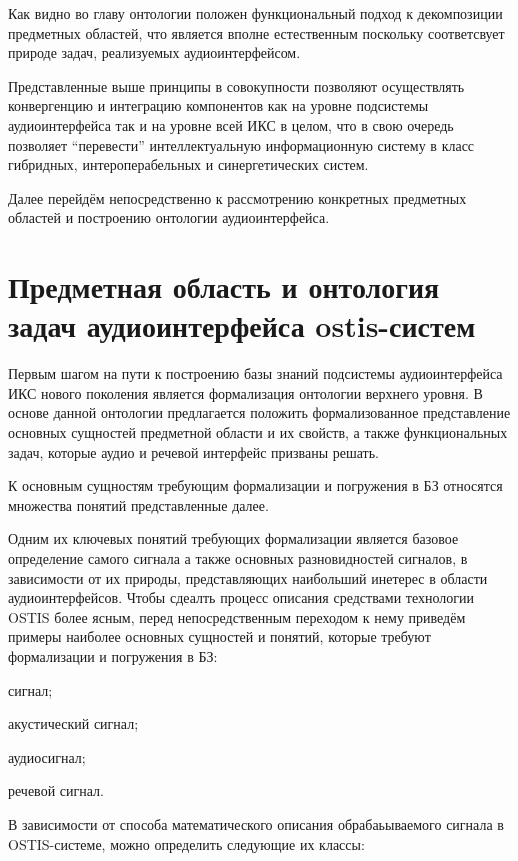 Как видно во главу онтологии положен функциональный подход к декомпозиции предметных областей, что является вполне естественным поскольку соответсвует природе задач, реализуемых аудиоинтерфейсом.

Представленные выше принципы в совокупности позволяют осуществлять конвергенцию и интеграцию компонентов как на уровне подсистемы аудиоинтерфейса так и на уровне всей ИКС в целом, что в свою очередь позволяет “перевести” интеллектуальную информационную систему в класс гибридных, интероперабельных и синергетических систем.
  
 Далее перейдём непосредственно к рассмотрению конкретных предметных областей и построению онтологии аудиоинтерфейса.

\section{Предметная область и онтология задач аудиоинтерфейса ostis-систем}
Первым шагом на пути к построению базы знаний подсистемы аудиоинтерфейса ИКС нового поколения является формализация онтологии верхнего уровня. В основе данной онтологии предлагается положить формализованное представление основных сущностей предметной области и их свойств, а также функциональных задач, которые аудио и речевой интерфейс призваны решать. 

К основным сущностям требующим формализации и погружения в БЗ относятся множества понятий представленные далее. 

Одним их ключевых понятий требующих формализации является базовое определение самого сигнала а также основных разновидностей сигналов, в зависимости от их природы, представляющих наибольший инетерес в области аудиоинтерфейсов. Чтобы сдеалть процесс описания средствами технологии OSTIS более ясным, перед непосредственным переходом к нему приведём примеры наиболее  основных сущностей и понятий, которые требуют формализации и погружения в БЗ:

\begin{textitemize}    
    \item сигнал;
    \item акустический сигнал;
    \item аудиосигнал;
    \item речевой сигнал.
\end{textitemize}

В зависимости от способа математического описания обрабаьываемого сигнала в  OSTIS-системе, можно определить следующие их классы:

